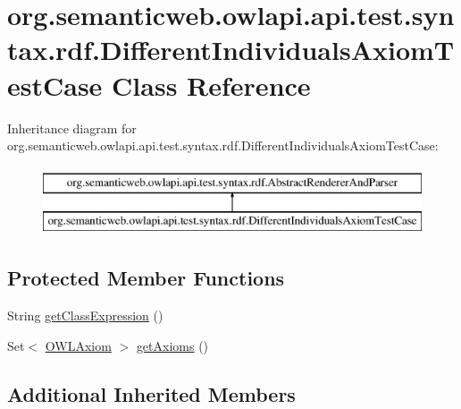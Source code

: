 \hypertarget{classorg_1_1semanticweb_1_1owlapi_1_1api_1_1test_1_1syntax_1_1rdf_1_1_different_individuals_axiom_test_case}{\section{org.\-semanticweb.\-owlapi.\-api.\-test.\-syntax.\-rdf.\-Different\-Individuals\-Axiom\-Test\-Case Class Reference}
\label{classorg_1_1semanticweb_1_1owlapi_1_1api_1_1test_1_1syntax_1_1rdf_1_1_different_individuals_axiom_test_case}
}
Inheritance diagram for org.\-semanticweb.\-owlapi.\-api.\-test.\-syntax.\-rdf.\-Different\-Individuals\-Axiom\-Test\-Case\-:\begin{figure}[H]
\begin{center}
\leavevmode
\includegraphics[height=2.000000cm]{classorg_1_1semanticweb_1_1owlapi_1_1api_1_1test_1_1syntax_1_1rdf_1_1_different_individuals_axiom_test_case}
\end{center}
\end{figure}
\subsection*{Protected Member Functions}
\begin{DoxyCompactItemize}
\item 
String \hyperlink{classorg_1_1semanticweb_1_1owlapi_1_1api_1_1test_1_1syntax_1_1rdf_1_1_different_individuals_axiom_test_case_a8989ac38f6c6993da73f1211ea90bdee}{get\-Class\-Expression} ()
\item 
Set$<$ \hyperlink{interfaceorg_1_1semanticweb_1_1owlapi_1_1model_1_1_o_w_l_axiom}{O\-W\-L\-Axiom} $>$ \hyperlink{classorg_1_1semanticweb_1_1owlapi_1_1api_1_1test_1_1syntax_1_1rdf_1_1_different_individuals_axiom_test_case_a267bcbb3b4ae80c55cc383bafa25f4b0}{get\-Axioms} ()
\end{DoxyCompactItemize}
\subsection*{Additional Inherited Members}


